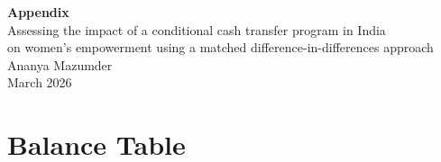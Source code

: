 \documentclass{article}        %
\begin{document}
\begin{titlepage}
  \centering
  \vspace*{2cm}
  
  {\Large \textbf{Appendix}} \\[1cm]
  
  {\large Assessing the impact of a conditional cash transfer program in India \\ 
  on women's empowerment using a matched difference-in-differences approach} \\[1cm]
  
  {\normalsize Ananya Mazumder} \\[0.5cm]
  {\normalsize March 2026}
  
\end{titlepage}

\section{Balance Table}
\end{document}
